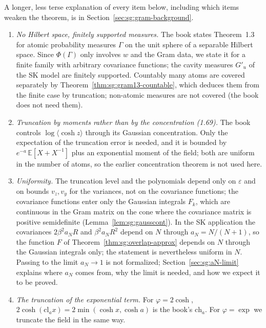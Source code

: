 \begin{remark}\label{rem:sg:gram-deviation}
A longer, less terse explanation of every item below, including which items weaken the theorem, is in Section~\ref{sec:sg:gram-background}.
\begin{enumerate}
\item \emph{No Hilbert space, finitely supported measures.} The book states Theorem~1.3 for atomic probability measures $\Gamma$ on the unit sphere of a separable Hilbert space.
Since $\Phi(\Gamma)$ only involves $w$ and the Gram data, we state it for a finite family with arbitrary covariance functions; the cavity measures $G'_u$ of the SK model are finitely supported.
Countably many atoms are covered separately by Theorem~\ref{thm:sg:gram13-countable}, which deduces them from the finite case by truncation; non-atomic measures are not covered (the book does not need them).
\item \emph{Truncation by moments rather than by the concentration (1.69).} The book controls $\log\langle\cosh z\rangle$ through its Gaussian concentration. Only the expectation of the truncation error is needed,
and it is bounded by $e^{-a}\,\mathbb E[X+X^{-1}]$ plus an exponential moment of the field; both are uniform in the number of atoms, so the earlier concentration theorem is not used here.
\item \emph{Uniformity.} The truncation level and the polynomials depend only on $\varepsilon$ and on bounds $v_z,v_y$ for the variances, not on the covariance functions; the covariance functions enter only the
Gaussian integrals $F_k$, which are continuous in the Gram matrix on the cone where the covariance matrix is positive semidefinite (Lemma~\ref{lem:sg:gausscont}). In the SK application the covariances $2\beta^2a_NR$ and $\beta^2a_NR^2$
depend on $N$ through $a_N=N/(N+1)$, so the function $F$ of Theorem~\ref{thm:sg:overlap-approx} depends on $N$ through the Gaussian integrals only; the statement is nevertheless uniform in $N$. Passing to the limit $a_N\to1$ is not formalized; Section~\ref{sec:sg:aN-limit} explains where $a_N$ comes from, why the limit is needed, and how we expect it to be proved.
\item \emph{The truncation of the exponential term.} For $\varphi=2\cosh$, $2\cosh(\mathrm{cl}_ax)=2\min(\cosh x,\cosh a)$ is the book's $\mathrm{ch}_a$. For $\varphi=\exp$ we truncate the field in the same way.
\end{enumerate}
\end{remark}

